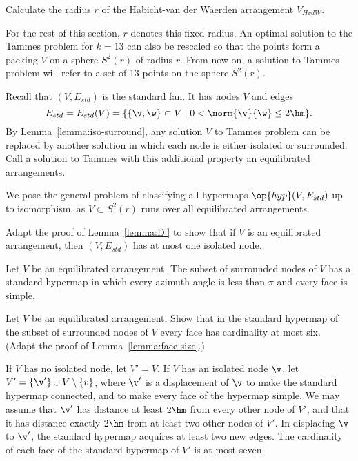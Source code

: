 \begin{exer}
Calculate the radius $r$ of the Habicht-van der Waerden arrangement $V_{HvdW}$.
\end{exer}

For the rest of this section, $r$ denotes this fixed radius.  An
optimal solution to the Tammes problem for $k=13$ can also be rescaled
so that the points form a packing $V$ on a sphere $S^2(r)$ of radius
$r$.  From now on, a solution to Tammes problem will refer to a set of
$13$ points on the sphere $S^2(r)$.

Recall that $(V,E_{std})$ is the standard fan.  It has nodes $V$ and edges
\[
E_{std} = E_{std}(V) = \{\{\v,\w\}\subset V\mid 0 <
\norm{\v}{\w} \le 2\hm\}.
\]
By Lemma~\ref{lemma:iso-surround}, any solution $V$ to Tammes problem
can be replaced by another solution in which each node is either
isolated or surrounded.  Call a solution to Tammes
with this additional property an equilibrated arrangements.


We pose the general problem of classifying
all hypermaps $\op{hyp}(V,E_{std})$ up to isomorphism, as $V\subset
S^2(r)$ runs over all equilibrated arrangements.

\begin{exer}
  Adapt the proof of Lemma~\ref{lemma:D'} to show that if $V$ is an
  equilibrated arrangement, then $(V,E_{std})$ has at most one
  isolated node.
\end{exer}

Let $V$ be an equilibrated arrangement.   The subset
of surrounded nodes of $V$ has a standard hypermap in which every
azimuth angle is less than $\pi$ and every face is simple.

\begin{exer} 
  Let $V$ be an equilibrated arrangement.  Show that in the standard
  hypermap of the subset of surrounded nodes of $V$ every face has
  cardinality at most six.  (Adapt the proof of
  Lemma~\ref{lemma:face-size}.)
\end{exer}

If $V$ has no isolated node, let $V'=V$.  If $V$ has an isolated node
$\v$, let $V' = \{\v'\}\cup V\setminus\{v\}$, where $\v'$ is a
displacement of $\v$ to make the standard hypermap connected, and to
make every face of the hypermap simple.  We may assume that $\v'$ has
distance at least $2\hm$ from every other node of $V'$, and that it
has distance exactly $2\hm$ from at least two other nodes of $V'$.  In
displacing $\v$ to $\v'$, the standard hypermap acquires at least two
new edges.  The cardinality of each face of the standard hypermap of
$V'$ is at most seven.


